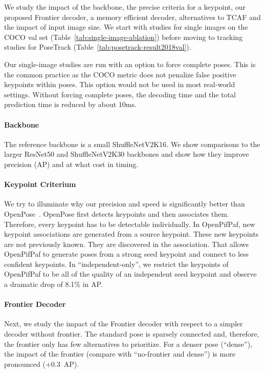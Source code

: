 \documentclass[journal]{IEEEtran}
\begin{document}
We study the impact of the backbone, the precise criteria for a keypoint,
our proposed Frontier decoder, a memory efficient
decoder, alternatives to TCAF and the impact of input image size.
We start with studies for single images on the COCO val set
(Table~\ref{tab:single-image-ablation}) before moving to
tracking studies for PoseTrack (Table~\ref{tab:posetrack-result2018val}).

Our single-image studies are run with an option to force complete poses. This is the
common practice as the COCO metric does not penalize false positive
keypoints within poses. This option would not be used in most real-world
settings. Without forcing complete poses, the decoding time and
the total prediction time is reduced by about 10ms.

\paragraph{Backbone}
The reference backbone is a small ShuffleNetV2K16. We show comparisons to the
larger ResNet50 and ShuffleNetV2K30 backbones and show how they improve
precision (AP) and at what cost in timing.

\paragraph{Keypoint Criterium}
We try to illuminate why our precision and speed is significantly better than
OpenPose~\cite{cao2017realtime}. OpenPose first detects keypoints and then
associates them. Therefore, every keypoint has to be detectable individually.
In OpenPifPaf, new keypoint associations are generated from a source keypoint.
These new keypoints are not previously known. They are discovered in the
association. That allows OpenPifPaf to generate poses from a strong seed
keypoint and connect to less confident keypoints. In ``independent-only'',
we restrict the keypoints of OpenPifPaf to be all of the quality of
an independent seed keypoint and observe a dramatic drop of 8.1\% in AP.

\paragraph{Frontier Decoder}
Next, we study the impact
of the Frontier decoder with respect to a simpler decoder without frontier.
The standard pose is sparsely connected and, therefore, the frontier only
has few alternatives to prioritize. For a denser pose (``dense''), the
impact of the frontier (compare with ``no-frontier and dense'') is more
pronounced (+0.3~AP).
\end{document}

